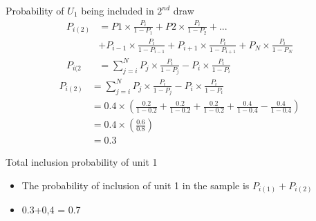 \documentclass[10pt]{beamer}
\begin{document}
\begin{frame}{Probability of $U_1$ being included in $2^{nd}$ draw}
\begin{align*}
P_{i(2)} &= P1 \times \frac{P_i}{1-P_1} + P2 \times \frac{P_i}{1-P_2} + ... \\ &+ P_{i-1} \times \frac{P_{i}}{1-P_{i-1}} + P_{i+1} \times \frac{P_{i}}{1-P_{i+1}} + P_{N} \times \frac{P_{i}}{1-P_{N}}\\
P_{i(2} &= \sum_{j=i}^N P_j \times \frac{P_i}{1-P_j} - P_i \times \frac{P_i}{1-P_i}
\end{align*}
\begin{align*}
    P_{i(2)} &= \sum_{j=i}^N P_j \times \frac{P_i}{1-P_j} - P_i \times \frac{P_i}{1-P_i}\\
    &= 0.4 \times \left (\frac{0.2}{1-0.2} + \frac{0.2}{1-0.2} + \frac{0.2}{1-0.2} + \frac{0.4}{1-0.4} - \frac{0.4}{1-0.4} \right)\\
    &= 0.4 \times \left (\frac{0.6}{0.8} \right)\\
    &=0.3
\end{align*}
\end{frame}

\begin{frame}{Total inclusion probability of unit 1}
\begin{itemize}
\item The probability of inclusion of unit 1 in the sample is $P_{i(1)}+P_{i(2)}$
\item 0.3+0,4 = 0.7
\end{itemize}
\end{frame}
\end{document}
